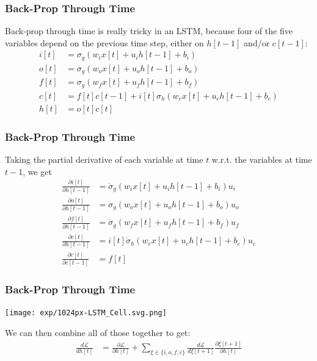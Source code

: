 \documentclass{beamer}
\begin{document}
\begin{frame}
  \frametitle{Back-Prop Through Time}
  Back-prop through time is really tricky in an LSTM, because four of the five
  variables depend on the previous time step, either on $h[t-1]$ and/or $c[t-1]$:
  \begin{align*}
    i[t] &=\sigma_g(w_i x[t]+u_i h[t-1]+b_i)\\
    o[t] &=\sigma_g(w_o x[t]+u_o h[t-1]+b_o)\\
    f[t] &=\sigma_g(w_f x[t]+u_f h[t-1]+b_f)\\
    c[t] &=f[t]c[t-1]+i[t]\sigma_h\left(w_cx[t]+u_ch[t-1]+b_c\right)\\
    h[t] &=o[t]c[t]
  \end{align*}
\end{frame}

\begin{frame}
  \frametitle{Back-Prop Through Time}

  Taking the partial derivative of each variable at time $t$
  w.r.t. the variables at time $t-1$, we get
  \begin{align*}
    \frac{\partial i[t]}{\partial h[t-1]}
    &=\dot\sigma_g(w_i x[t]+u_i h[t-1]+b_i)u_i\\
    \frac{\partial o[t]}{\partial h[t-1]}
    &=\dot\sigma_g(w_o x[t]+u_o h[t-1]+b_o)u_o\\
    \frac{\partial f[t]}{\partial h[t-1]}
    &=\dot\sigma_g(w_f x[t]+u_f h[t-1]+b_f)u_f\\
    \frac{\partial c[t]}{\partial h[t-1]}
    &=i[t]\dot\sigma_h\left(w_cx[t]+u_ch[t-1]+b_c\right)u_c\\
    \frac{\partial c[t]}{\partial c[t-1]}
    &=f[t]
  \end{align*}
\end{frame}

\begin{frame}
  \frametitle{Back-Prop Through Time}

  \centerline{\texttt{[image: exp/1024px-LSTM\_Cell.svg.png]}}

  We can then combine all of those together to get:
  \begin{align*}
    \frac{d{\mathcal L}}{d h[t]}
    &= \frac{\partial{\mathcal L}}{\partial h[t]} +
    \sum_{\xi\in\{i,o,f,c\}}\frac{d{\mathcal L}}{d\xi[t+1]}
    \frac{\partial\xi[t+1]}{\partial h[t]}
  \end{align*}
\end{frame}
\end{document}
